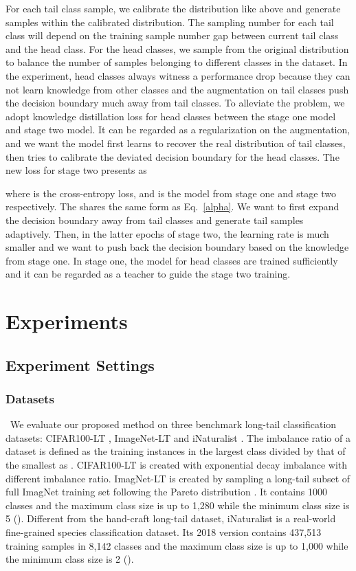 \documentclass[runningheads]{llncs}
\begin{document}
For each tail class sample, we calibrate the distribution like above and generate samples within the calibrated distribution. The sampling number for each tail class will depend on the training sample number gap between current tail class and the head class. For the head classes, we sample from the original distribution to balance the number of samples belonging to different classes in the dataset. In the experiment, head classes always witness a performance drop because they can not learn knowledge from other classes and the augmentation on tail classes push the decision boundary much away from tail classes. To alleviate the problem, we adopt knowledge distillation loss for head classes between the stage one model and stage two model. It can be regarded as a regularization on the augmentation, and we want the model first learns to recover the real distribution of tail classes, then tries to calibrate the deviated decision boundary for the head classes. The new loss for stage two presents as


where  is the cross-entropy loss, and  is the model from stage one and stage two respectively. The  shares the same form as Eq.~\ref{alpha}. We want to first expand the decision boundary away from tail classes and generate tail samples adaptively. Then, in the latter epochs of stage two, the learning rate is much smaller and we want to push back the decision boundary based on the knowledge from stage one. In stage one, the model for head classes are trained sufficiently and it can be regarded as a teacher to guide the stage two training.

\section{Experiments}
\subsection{Experiment Settings}
\subsubsection{Datasets}  \ We evaluate our proposed method on three benchmark long-tail classification datasets: CIFAR100-LT \cite{cao2019learning}, ImageNet-LT \cite{kang2019decoupling} and iNaturalist \cite{van2018inaturalist}. The imbalance ratio of a dataset is defined as the training instances in the largest class divided by that of the smallest as . CIFAR100-LT is created with exponential decay imbalance with different imbalance ratio. ImagNet-LT is created by sampling a long-tail subset of full ImagNet training set following the Pareto distribution . It contains 1000 classes and the maximum class size is up to 1,280 while the minimum class size is 5 (). Different from the hand-craft long-tail dataset, iNaturalist is a real-world fine-grained species classification dataset. Its 2018 version contains 437,513 training samples in 8,142 classes and the maximum class size is up to 1,000 while the minimum class size is 2  ().
\end{document}

